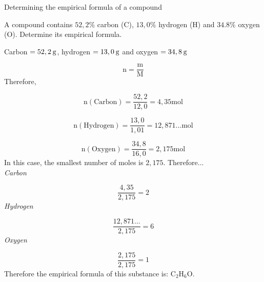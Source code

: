     \noindent
\label{m38712*secfhsst!!!underscore!!!id1029}
      \noindent 
      \begin{wex}{Determining the empirical formula of a compound }{
      \label{m38712*probfhsst!!!underscore!!!id1030}
      \label{m38712*id280897}A compound contains $52,2\%$ carbon ($\text{C}$), $13,0\%$ hydrogen ($\text{H}$) and $34.8\%$ oxygen ($\text{O}$). Determine its empirical formula. 
     
}
{ %
      \label{m38712*id280928}Carbon $=52,2\phantom{\rule{2pt}{0ex}}\text{g}$, hydrogen $=13,0\phantom{\rule{2pt}{0ex}}\text{g}$ and oxygen $=34,8\phantom{\rule{2pt}{0ex}}\text{g}$ 
      \label{m38712*id280954}\nopagebreak\noindent{}
        
    \begin{equation*}
    \text{n}=\frac{\text{m}}{\text{M}}
      \end{equation*}
      \label{m38712*id280975}Therefore, 
      \label{m38712*id280978}\nopagebreak\noindent{}
        
    \begin{equation*}
    \text{n}\left(\text{Carbon}\right)=\frac{52,2}{12,0}=4,35\text{mol}
      \end{equation*}
      \label{m38712*id281042}\nopagebreak\noindent{}
        
    \begin{equation*}
    \text{n}\left(\text{Hydrogen}\right)=\frac{13,0}{1,01}=12,871...\text{mol}
      \end{equation*}
      \label{m38712*id281111}\nopagebreak\noindent{}
        
    \begin{equation*}
    \text{n}\left(\text{Oxygen}\right)=\frac{34,8}{16,0}=2,175\text{mol}
      \end{equation*}
In this case, the smallest number of moles is $2,175$. Therefore... \\ 
      \label{m38712*id281179}
        \textsl{Carbon}
 
      \label{m38712*id281185}\nopagebreak\noindent{}
        
    \begin{equation*}
    \frac{4,35}{2,175}=2
      \end{equation*}
      \label{m38712*id281217}
        \textsl{Hydrogen}
     
      \label{m38712*id281223}\nopagebreak\noindent{}
        
    \begin{equation*}
    \frac{12,871...}{2,175}=6
      \end{equation*}
      \label{m38712*id281254}
        \textsl{Oxygen}
      
      \label{m38712*id281261}\nopagebreak\noindent{}
        
    \begin{equation*}
    \frac{2,175}{2,175}=1
      \end{equation*}
      \label{m38712*id281292}Therefore the empirical formula of this substance is: ${\text{C}}_{2}{\text{H}}_{6}\text{O}$.
}
    \end{wex}
